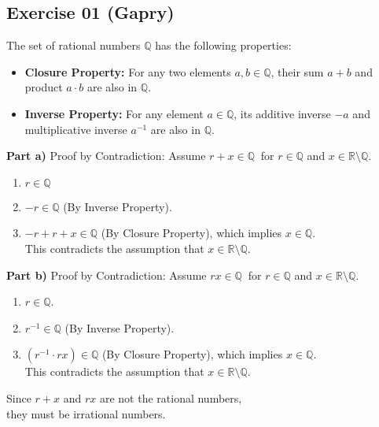 \subsection*{Exercise 01 (Gapry)}
The set of rational numbers $\mathbb{Q}$ has the following properties:
\begin{itemize}
    \item \textbf{Closure Property:} For any two elements $a, b \in \mathbb{Q}$, their sum $a + b$ and product $a \cdot b$ are also in $\mathbb{Q}$.
    \item \textbf{Inverse Property:} For any element $a \in \mathbb{Q}$, its additive inverse $-a$ and multiplicative inverse $a^{-1}$ are also in $\mathbb{Q}$.
\end{itemize}

\begin{flushleft}
\textbf{Part a)} Proof by Contradiction: Assume $r + x \in \mathbb{Q}\ $ for $r \in \mathbb{Q}$ and $x \in \mathbb{R} \setminus \mathbb{Q}$.
\begin{enumerate}
    \item $r \in \mathbb{Q}$
    \item $-r \in \mathbb{Q}$ (By Inverse Property).
    \item $-r + r + x \in \mathbb{Q}$ (By Closure Property), which implies $x \in \mathbb{Q}$. 
    \\
    This contradicts the assumption that $x \in \mathbb{R} \setminus \mathbb{Q}$.
\end{enumerate}
\end{flushleft}

\begin{flushleft}
\textbf{Part b)} Proof by Contradiction: Assume $rx \in \mathbb{Q}\ $ for $r \in \mathbb{Q}$ and $x \in \mathbb{R} \setminus \mathbb{Q}$.
\begin{enumerate}
    \item $r \in \mathbb{Q}$.
    \item $r^{-1} \in \mathbb{Q}$ (By Inverse Property).
    \item $(r^{-1} \cdot rx) \in \mathbb{Q}$ (By Closure Property), which implies $x \in \mathbb{Q}$. 
    \\
    This contradicts the assumption that $x \in \mathbb{R} \setminus \mathbb{Q}$.
\end{enumerate}
\end{flushleft}

\begin{flushleft}
Since $r + x$ and $rx$ are not the rational numbers, \\
they must be irrational numbers. 
\end{flushleft}

\pagebreak
